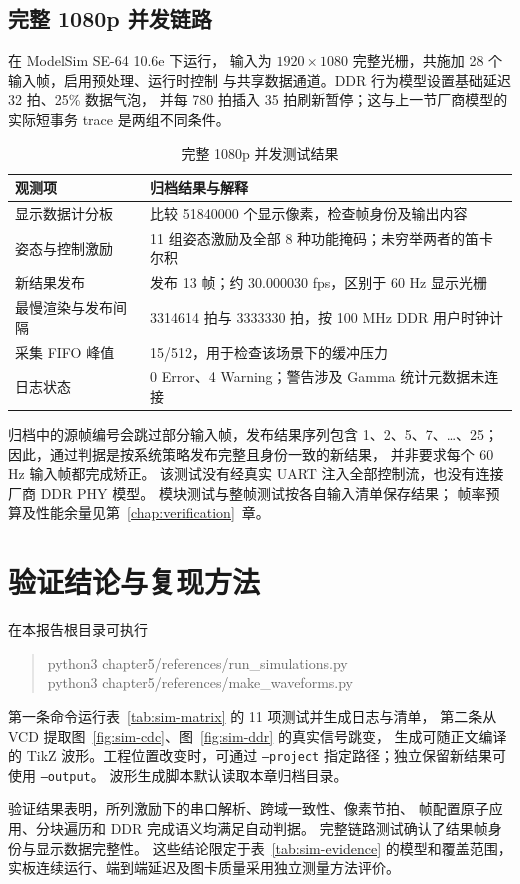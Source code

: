 \subsection{完整 1080p 并发链路}
 在 ModelSim SE-64 10.6e 下运行，
输入为 $1920\times1080$ 完整光栅，共施加 28 个输入帧，启用预处理、运行时控制
与共享数据通道。DDR 行为模型设置基础延迟 32 拍、25\% 数据气泡，
并每 780 拍插入 35 拍刷新暂停；这与上一节厂商模型的实际短事务 trace 是两组不同条件。

\begin{table}[htbp]\centering\small
\caption{完整 1080p 并发测试结果}\label{tab:sim-full-archive}
\begin{tabularx}{\textwidth}{>{\raggedright\arraybackslash}p{4.2cm}Y}
\toprule
观测项 & 归档结果与解释 \\
\midrule
显示数据计分板 & 比较 51840000 个显示像素，检查帧身份及输出内容 \\
姿态与控制激励 & 11 组姿态激励及全部 8 种功能掩码；未穷举两者的笛卡尔积 \\
新结果发布 & 发布 13 帧；约 30.000030 fps，区别于 60 Hz 显示光栅 \\
最慢渲染与发布间隔 & 3314614 拍与 3333330 拍，按 100 MHz DDR 用户时钟计 \\
采集 FIFO 峰值 & 15/512，用于检查该场景下的缓冲压力 \\
日志状态 & 0 Error、4 Warning；警告涉及 Gamma 统计元数据未连接 \\
\bottomrule
\end{tabularx}
\end{table}

归档中的源帧编号会跳过部分输入帧，发布结果序列包含
1、2、5、7、\ldots、25；因此，通过判据是按系统策略发布完整且身份一致的新结果，
并非要求每个 60 Hz 输入帧都完成矫正。
该测试没有经真实 UART 注入全部控制流，也没有连接厂商 DDR PHY 模型。
模块测试与整帧测试按各自输入清单保存结果；
帧率预算及性能余量见第~\ref{chap:verification}~章。

\section{验证结论与复现方法}
在本报告根目录可执行
\begin{quote}\small\ttfamily
python3 chapter5/references/run\_simulations.py\\
python3 chapter5/references/make\_waveforms.py
\end{quote}
第一条命令运行表~\ref{tab:sim-matrix} 的 11 项测试并生成日志与清单，
第二条从 VCD 提取图~\ref{fig:sim-cdc}、图~\ref{fig:sim-ddr} 的真实信号跳变，
生成可随正文编译的 TikZ 波形。工程位置改变时，可通过
\texttt{--project} 指定路径；独立保留新结果可使用 \texttt{--output}。
波形生成脚本默认读取本章归档目录。

验证结果表明，所列激励下的串口解析、跨域一致性、像素节拍、
帧配置原子应用、分块遍历和 DDR 完成语义均满足自动判据。
完整链路测试确认了结果帧身份与显示数据完整性。
这些结论限定于表~\ref{tab:sim-evidence} 的模型和覆盖范围，
实板连续运行、端到端延迟及图卡质量采用独立测量方法评价。
